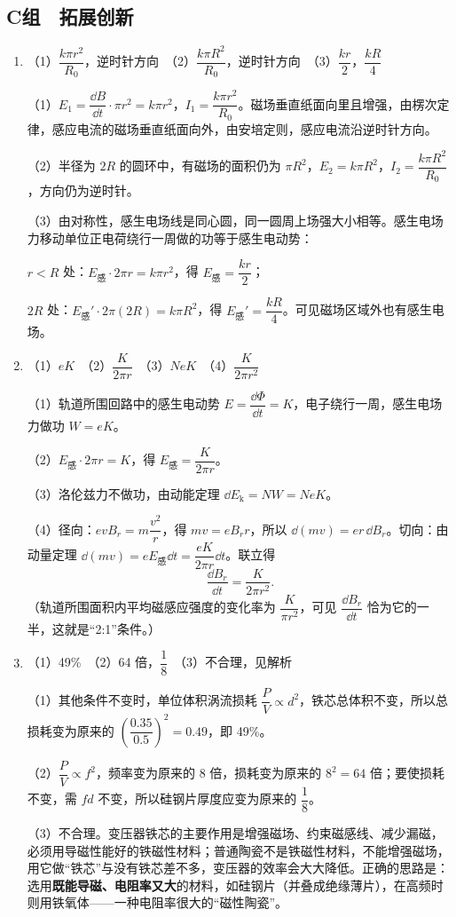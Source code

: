 \subsection*{C组　拓展创新}
\begin{enumerate}[label=\arabic*．,leftmargin=1.8em,itemsep=4pt,start=15]
\item {}（1）$\dfrac{k\pi r^2}{R_0}$，逆时针方向　（2）$\dfrac{k\pi R^2}{R_0}$，逆时针方向　（3）$\dfrac{kr}{2}$，$\dfrac{kR}{4}$

（1）$E_1=\dfrac{\dd B}{\dd t}\cdot\pi r^2=k\pi r^2$，$I_1=\dfrac{k\pi r^2}{R_0}$。磁场垂直纸面向里且增强，由楞次定律，感应电流的磁场垂直纸面向外，由安培定则，感应电流沿逆时针方向。

（2）半径为 $2R$ 的圆环中，有磁场的面积仍为 $\pi R^2$，$E_2=k\pi R^2$，$I_2=\dfrac{k\pi R^2}{R_0}$，方向仍为逆时针。

（3）由对称性，感生电场线是同心圆，同一圆周上场强大小相等。感生电场力移动单位正电荷绕行一周做的功等于感生电动势：

$r<R$ 处：$E_{\text{感}}\cdot2\pi r=k\pi r^2$，得 $E_{\text{感}}=\dfrac{kr}{2}$；

$2R$ 处：$E_{\text{感}}'\cdot2\pi(2R)=k\pi R^2$，得 $E_{\text{感}}'=\dfrac{kR}{4}$。可见磁场区域外也有感生电场。

\item {}（1）$eK$　（2）$\dfrac{K}{2\pi r}$　（3）$NeK$　（4）$\dfrac{K}{2\pi r^2}$

（1）轨道所围回路中的感生电动势 $E=\dfrac{\dd\Phi}{\dd t}=K$，电子绕行一周，感生电场力做功 $W=eK$。

（2）$E_{\text{感}}\cdot2\pi r=K$，得 $E_{\text{感}}=\dfrac{K}{2\pi r}$。

（3）洛伦兹力不做功，由动能定理 $\dd E_{\mathrm k}=NW=NeK$。

（4）径向：$evB_r=m\dfrac{v^2}{r}$，得 $mv=eB_rr$，所以 $\dd(mv)=er\,\dd B_r$。切向：由动量定理 $\dd(mv)=eE_{\text{感}}\dd t=\dfrac{eK}{2\pi r}\dd t$。联立得
\[\frac{\dd B_r}{\dd t}=\frac{K}{2\pi r^2}.\]
（轨道所围面积内平均磁感应强度的变化率为 $\dfrac{K}{\pi r^2}$，可见 $\dfrac{\dd B_r}{\dd t}$ 恰为它的一半，这就是“2:1”条件。）

\item {}（1）49\%　（2）64 倍，$\dfrac18$　（3）不合理，见解析

（1）其他条件不变时，单位体积涡流损耗 $\dfrac PV\propto d^2$，铁芯总体积不变，所以总损耗变为原来的 $\left(\dfrac{0.35}{0.5}\right)^2=0.49$，即 49\%。

（2）$\dfrac PV\propto f^2$，频率变为原来的 8 倍，损耗变为原来的 $8^2=64$ 倍；要使损耗不变，需 $fd$ 不变，所以硅钢片厚度应变为原来的 $\dfrac18$。

（3）不合理。变压器铁芯的主要作用是增强磁场、约束磁感线、减少漏磁，必须用导磁性能好的铁磁性材料；普通陶瓷不是铁磁性材料，不能增强磁场，用它做“铁芯”与没有铁芯差不多，变压器的效率会大大降低。正确的思路是：选用\textbf{既能导磁、电阻率又大}的材料，如硅钢片（并叠成绝缘薄片），在高频时则用铁氧体——一种电阻率很大的“磁性陶瓷”。
\end{enumerate}
